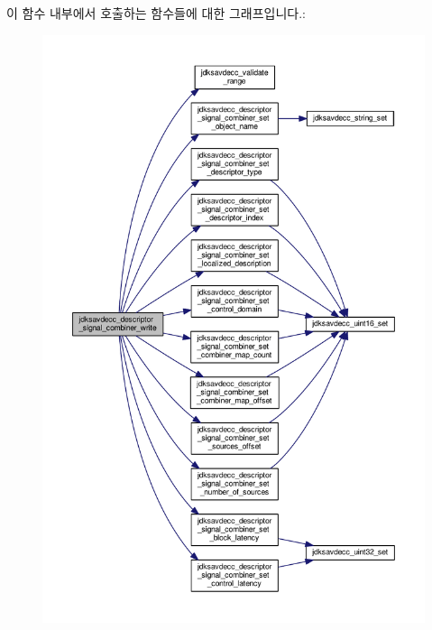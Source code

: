 이 함수 내부에서 호출하는 함수들에 대한 그래프입니다.\+:
\nopagebreak
\begin{figure}[H]
\begin{center}
\leavevmode
\includegraphics[width=350pt]{group__descriptor__signal__combiner_gaad6b12ccd137674d9844f8718e8c7c7b_cgraph}
\end{center}
\end{figure}


